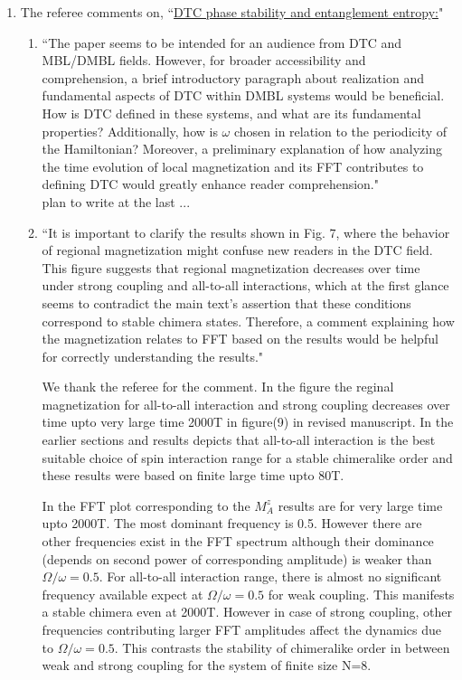\documentclass[10pt,
superscriptaddress,
amsmath,amssymb,showkeys,
aps, 
prb,
]{revtex4-2}
\newcommand{\response}[1]{{\color{black}#1}} %
\newcommand{\comment}[1]{{\color{blue}#1}} %
\begin{document}
\begin{enumerate}
\begin{enumerate}
		\item The referee comments on, \comment{``\underline{DTC phase stability and entanglement entropy:}"}
		\begin{enumerate}
			\item \comment{``The paper seems to be intended for an audience from DTC and MBL/DMBL fields. However, for broader accessibility and comprehension, a brief introductory paragraph about realization and fundamental aspects of DTC within DMBL
			systems would be beneficial. How is DTC defined in these systems, and what are its fundamental properties? Additionally, how is $\omega$ chosen in relation to the periodicity of the Hamiltonian? Moreover, a preliminary explanation of how analyzing the time evolution of local magnetization and its FFT contributes to defining DTC would greatly enhance reader comprehension."}\\
		
			\response{ plan to write at the last ... 
			}
			\item \comment{``It is important to clarify the results shown in Fig. 7, where the behavior of regional magnetization might confuse new readers in the DTC field. This figure suggests that regional magnetization decreases over time under strong coupling and all-to-all interactions, which at the first glance seems to contradict the main text’s assertion that these conditions correspond to stable chimera states. Therefore, a comment  explaining how the magnetization relates to FFT based on the results would be helpful for correctly understanding the results."}\\
			
			\response{
			We thank the referee for the comment. In the figure the reginal magnetization for all-to-all interaction and strong coupling  decreases over time upto very large time 2000T in figure(9) in revised manuscript. In the earlier sections and results depicts that all-to-all interaction is the best suitable choice of spin interaction range for a stable chimeralike order and these results were based on finite large time upto 80T.
			
			In the FFT plot corresponding to the $M^z_A$ results are for very large time upto 2000T. The most dominant frequency is 0.5. However there are other frequencies exist in the FFT spectrum although their dominance (depends on second power of corresponding amplitude) is weaker than $\Omega/\omega=0.5$. For all-to-all interaction range, there is almost no significant frequency available expect at $\Omega/\omega=0.5$ for weak coupling. This manifests a stable chimera even at 2000T. However in case of strong coupling, other frequencies contributing larger FFT amplitudes affect the dynamics due to  $\Omega/\omega=0.5$. This contrasts the stability of chimeralike order in between  weak and strong coupling for the system of finite size N=8.
			
}
\end{enumerate}
\end{enumerate}
\end{enumerate}
\end{document}
